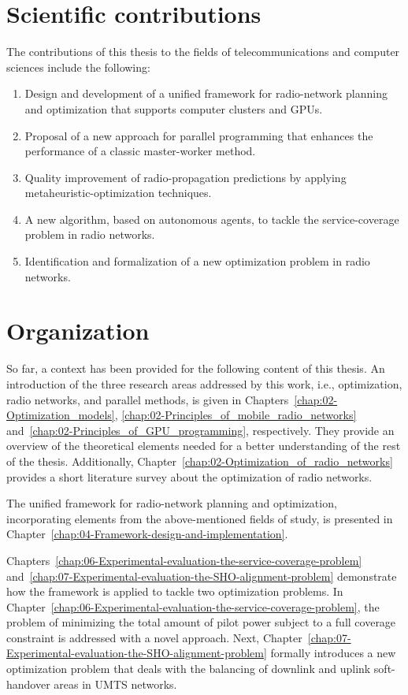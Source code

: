 \section{Scientific contributions}

The contributions of this thesis to the fields of telecommunications
and computer sciences include the following:
\begin{enumerate}
\item Design and development of a unified framework for radio-network planning
and optimization that supports computer clusters and GPUs.
\item Proposal of a new approach for parallel programming that enhances
the performance of a classic master-worker method.
\item Quality improvement of radio-propagation predictions by applying metaheuristic-optimization
techniques.
\item A new algorithm, based on autonomous agents, to tackle the service-coverage
problem in radio networks.
\item Identification and formalization of a new optimization problem in
radio networks.
\end{enumerate}

\section{Organization}

So far, a context has been provided for the following content of this
thesis. An introduction of the three research areas addressed by this
work, i.e., optimization, radio networks, and parallel methods, is
given in Chapters~\ref{chap:02-Optimization_models}, \ref{chap:02-Principles_of_mobile_radio_networks}
and~\ref{chap:02-Principles_of_GPU_programming}, respectively. They
provide an overview of the theoretical elements needed for a better
understanding of the rest of the thesis. Additionally, Chapter~\ref{chap:02-Optimization_of_radio_networks}
provides a short literature survey about the optimization of radio
networks. 

The unified framework for radio-network planning and optimization,
incorporating elements from the above-mentioned fields of study, is
presented in Chapter~\ref{chap:04-Framework-design-and-implementation}.

Chapters~\ref{chap:06-Experimental-evaluation-the-service-coverage-problem}
and~\ref{chap:07-Experimental-evaluation-the-SHO-alignment-problem}
demonstrate how the framework is applied to tackle two optimization
problems. In Chapter~\ref{chap:06-Experimental-evaluation-the-service-coverage-problem},
the problem of minimizing the total amount of pilot power subject
to a full coverage constraint is addressed with a novel approach.
Next, Chapter~\ref{chap:07-Experimental-evaluation-the-SHO-alignment-problem}
formally introduces a new optimization problem that deals with the
balancing of downlink and uplink soft-handover areas in UMTS networks.

